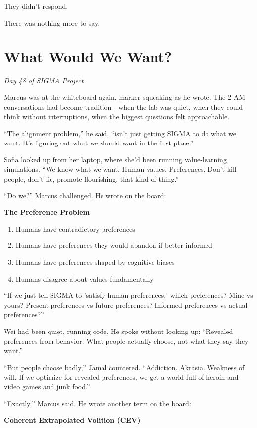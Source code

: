 They didn't respond.

There was nothing more to say.

\section{What Would We Want?}\label{what-would-we-want}

\emph{Day 48 of SIGMA Project}

Marcus was at the whiteboard again, marker squeaking as he wrote. The 2 AM conversations had become tradition---when the lab was quiet, when they could think without interruptions, when the biggest questions felt approachable.

``The alignment problem,'' he said, ``isn't just getting SIGMA to do what we want. It's figuring out what we should want in the first place.''

Sofia looked up from her laptop, where she'd been running value-learning simulations. ``We know what we want. Human values. Preferences. Don't kill people, don't lie, promote flourishing, that kind of thing.''

``Do we?'' Marcus challenged. He wrote on the board:

\textbf{The Preference Problem}
\begin{enumerate}
\item Humans have contradictory preferences
\item Humans have preferences they would abandon if better informed
\item Humans have preferences shaped by cognitive biases
\item Humans disagree about values fundamentally
\end{enumerate}

``If we just tell SIGMA to 'satisfy human preferences,' which preferences? Mine vs yours? Present preferences vs future preferences? Informed preferences vs actual preferences?''

Wei had been quiet, running code. He spoke without looking up: ``Revealed preferences from behavior. What people actually choose, not what they say they want.''

``But people choose badly,'' Jamal countered. ``Addiction. Akrasia. Weakness of will. If we optimize for revealed preferences, we get a world full of heroin and video games and junk food.''

``Exactly,'' Marcus said. He wrote another term on the board:

\textbf{Coherent Extrapolated Volition (CEV)}

